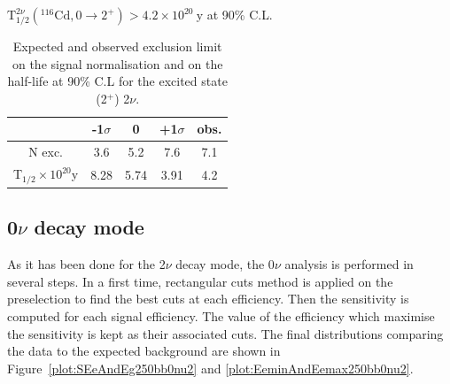 \documentclass[main.tex]{subfiles}
\begin{document}
\begin{center}
$ \text{T}_{\text{1/2}}^{\text{2}\nu} (^{\text{116}} \text{Cd}, \text{0} \rightarrow \text{2}^{+}) > \text{4.2} \times \text{10}^{\text{20}}~\text{y}$ at 90\% C.L.
\end{center}


\begin{table}
\centering
\begin{tabular}{c|c|c|c||c}
                                                & -1$\sigma$ & 0        & +1$\sigma$ & obs.     \\[0.2cm]
\hline
N exc.                                          & 3.6        & 5.2      & 7.6        & 7.1      \\[0.2cm]
T$_{\text{1/2}} \times \text{10}^{\text{20}}$y  & 8.28       & 5.74     & 3.91       & 4.2      \\[0.2cm]
\hline
\end{tabular}
\caption{Expected and observed exclusion limit on the signal normalisation and on the half-life at 90\% C.L for the excited state (2$^+$) 2$\nu$.}
\label{Tab:FinalResultsbb2nu2}
\end{table}


\FloatBarrier


\subsection{0$\nu$ decay mode}\label{sec:AnalysisResult2PLUS0nu}


\NI As it has been done for the 2$\nu$ decay mode, the 0$\nu$ analysis is performed in several steps. In a first time, rectangular cuts method is applied on the preselection to find the best cuts at each efficiency. Then the sensitivity is computed for each signal efficiency. The value of the efficiency which maximise the sensitivity is kept as their associated cuts. The final distributions comparing the data to the expected background are shown in Figure~\ref{plot:SEeAndEg250bb0nu2} and \ref{plot:EeminAndEemax250bb0nu2}.
\end{document}
